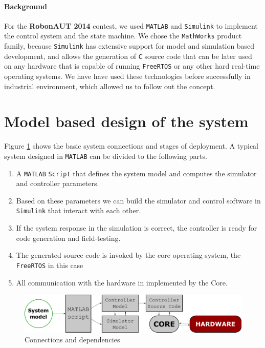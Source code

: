 \paragraph{Background}

For the \textbf{RobonAUT 2014} contest, we used \verb!MATLAB! and \verb!Simulink! to implement the control system and the state machine. We chose the \verb!MathWorks! product family, because \verb!Simulink! has extensive support for model and simulation based development, and allows the generation of \verb!C! source code that can be later used on any hardware that is capable of running \verb!FreeRTOS! or any other hard real-time operating systems. We have have used these technologies before successfully in industrial environment, which allowed us to follow out the concept.

\section{Model based design of the system}


Figure \ref{fig:architecture} shows the basic system connections and stages of deployment. A typical system designed in \verb!MATLAB! can be divided to the following parts.

\begin{enumerate}
\item A \verb!MATLAB! \verb!Script! that defines the system model and computes the simulator and controller parameters.
\item Based on these parameters we can build the simulator and control software in \verb!Simulink! that interact with each other.
\item If the system response in the simulation is correct, the controller is ready for code generation and field-testing.
\item The generated source code is invoked by the core operating system, the \verb!FreeRTOS! in this case
\item All communication with the hardware in implemented by the Core.
\end{enumerate}

\begin{figure}[!ht]
    \centering
    \includegraphics[width=0.7\linewidth]{img/architecture}
    \caption{Connections and dependencies}
    \label{fig:architecture}
\end{figure}

